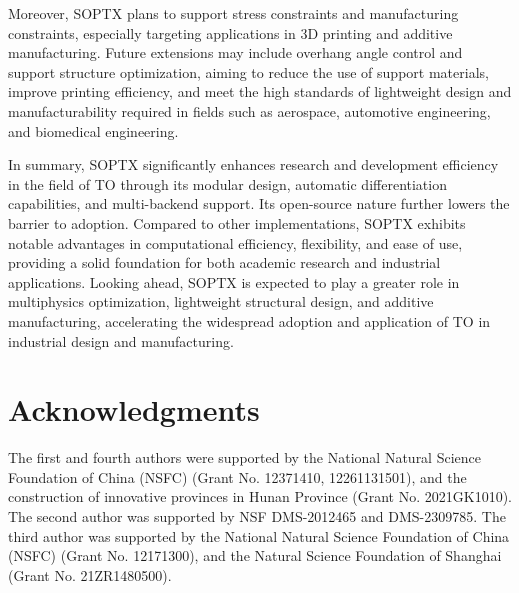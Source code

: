 \documentclass[mathpazo]{cicp}
\begin{document}
Moreover, SOPTX plans to support stress constraints and manufacturing constraints, especially targeting applications in 3D printing and additive manufacturing. Future extensions may include overhang angle control and support structure optimization, aiming to reduce the use of support materials, improve printing efficiency, and meet the high standards of lightweight design and manufacturability required in fields such as aerospace, automotive engineering, and biomedical engineering.

In summary, SOPTX significantly enhances research and development efficiency in the field of TO through its modular design, automatic differentiation capabilities, and multi-backend support. Its open-source nature further lowers the barrier to adoption. Compared to other implementations, SOPTX exhibits notable advantages in computational efficiency, flexibility, and ease of use, providing a solid foundation for both academic research and industrial applications. Looking ahead, SOPTX is expected to play a greater role in multiphysics optimization, lightweight structural design, and additive manufacturing, accelerating the widespread adoption and application of TO in industrial design and manufacturing.

\section*{Acknowledgments}
The first and fourth authors were supported by the National Natural Science
Foundation of China (NSFC) (Grant No. 12371410, 12261131501), and the
construction of innovative provinces in Hunan Province (Grant No. 2021GK1010).
The second author was supported by NSF DMS-2012465 and DMS-2309785. The third
author was supported by the National Natural Science Foundation of China (NSFC)
(Grant No. 12171300), and the Natural Science Foundation of Shanghai (Grant No.
21ZR1480500).

\appendix
\renewcommand{\thesection}{Appendix\,\Alph{section}.}
\end{document}
